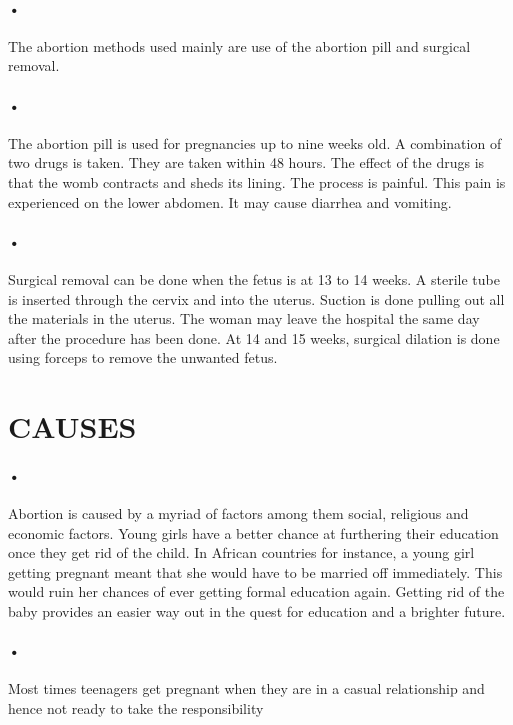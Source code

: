 \documentclass[12pt]{article}
\begin{document}
\paragraph{•}
The abortion methods used mainly are use of the abortion pill and surgical removal.
\paragraph{•}
The abortion pill is used for pregnancies up to nine weeks old. A combination of two drugs is taken. They are taken within 48 hours. The effect of the drugs is that the womb contracts and sheds its lining. The process is painful. This pain is experienced on the lower abdomen. It may cause diarrhea and vomiting.
\paragraph{•}
Surgical removal can be done when the fetus is at 13 to 14 weeks. A sterile tube is inserted through the cervix and into the uterus. Suction is done pulling out all the materials in the uterus. The woman may leave the hospital the same day after the procedure has been done. At 14 and 15 weeks, surgical dilation is done using forceps to remove the unwanted fetus.
  
\section{CAUSES}
\paragraph{•}
Abortion is caused by a myriad of factors among them social, religious and economic factors.
Young girls have a better chance at furthering their education once they get rid of the child. In African countries for instance, a young girl getting pregnant meant that she would have to be married off immediately. This would ruin her chances of ever getting formal education again. Getting rid of the baby provides an easier way out in the quest for education and a brighter future.
\paragraph{•}
Most times teenagers get pregnant when they are in a casual relationship and hence not ready to take the responsibility
\end{document}
